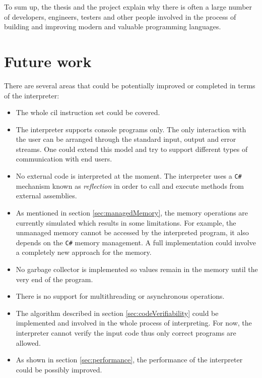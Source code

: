 \documentclass[declaration,shortabstract,english,mgr]{iithesis}
\begin{document}
To sum up, the thesis and the project explain why there is often a large number of developers, engineers, testers and other people involved in the process of building and improving modern and valuable programming languages.

\section{Future work}
\label{sec:future_work}

There are several areas that could be potentially improved or completed in terms of the interpreter:
\begin{itemize}
	\item{The whole \acrshort{cil} instruction set could be covered.}
	\item{The interpreter supports console programs only. The only interaction with the user can be arranged through the standard input, output and error streams. One could extend this model and try to support different types of communication with end users.}
	\item{No external code is interpreted at the moment. The interpreter uses a \texttt{C\#} mechanism known as \textit{reflection} in order to call and execute methods from external assemblies.}
	\item{As mentioned in section \ref{sec:managedMemory}, the memory operations are currently simulated which results in some limitations. For example, the unmanaged memory cannot be accessed by the interpreted program, it also depends on the \texttt{C\#} memory management. A full implementation could involve a completely new approach for the memory.}
	\item{No garbage collector is implemented so values remain in the memory until the very end of the program.}
	\item{There is no support for multithreading or asynchronous operations.}
	\item{The algorithm described in section \ref{sec:codeVerifiability} could be implemented and involved in the whole process of interpreting. For now, the interpreter cannot verify the input code thus only correct programs are allowed.}
	\item{As shown in section \ref{sec:performance}, the performance of the interpreter could be possibly improved.}
\end{itemize}

\clearpage

\end{document}
